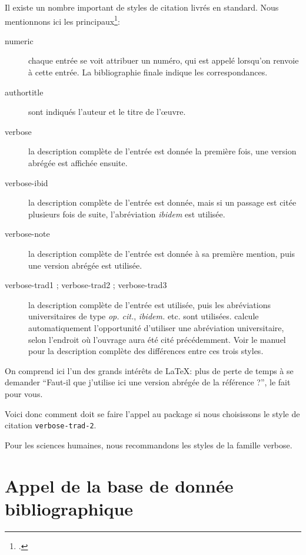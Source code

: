 Il existe un nombre important de styles de citation livrés en standard. Nous mentionnons ici les principaux\footcite[Se reporter pour plus de détails à][]{biblatex_style}:
\begin{description}
\item[numeric] chaque entrée se voit attribuer un numéro, qui est appelé lorsqu'on renvoie à cette entrée. La bibliographie finale indique les correspondances.
\item[authortitle] sont indiqués l'auteur et le titre de l'œuvre.
\item[verbose] la description complète de l'entrée est donnée la première fois, une version abrégée est affichée ensuite.
\item[verbose-ibid] la description complète de l'entrée est donnée, mais si un passage est citée plusieurs fois de suite, l'abréviation \emph{ibidem} est utilisée.
\item[verbose-note] la description complète de l'entrée est donnée à sa première mention, puis une version abrégée est utilisée.
\item[verbose-trad1 ; verbose-trad2 ; verbose-trad3] la description complète de l'entrée est utilisée, puis les abréviations universitaires de type \emph{op. cit.}, \emph{ibidem.} etc. sont utilisées.  calcule automatiquement l'opportunité d'utiliser une abréviation universitaire, selon l'endroit où l'ouvrage aura été cité précédemment. Voir le manuel pour la description complète des différences entre ces trois styles.
\end{description}

On comprend ici l'un des grands intérêts de \LaTeX : plus de perte de temps à se demander \enquote{Faut-il que j'utilise ici une version abrégée de la référence ?},  le fait pour vous.

Voici donc comment doit se faire l'appel au package si nous choisissons le style de citation \verb|verbose-trad-2|.

\begin{latexcode}
\usepackage[citestyle=verbose-trad2]{biblatex}
\end{latexcode}

Pour les sciences humaines, nous recommandons les styles de la famille verbose.


\section{Appel de la base de donnée bibliographique}


